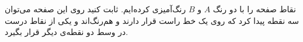     \p 
نقاط صفحه را با دو رنگ
$A$
و
$B$
رنگ‌آمیزی کرده‌ایم. ثابت کنید روی این صفحه می‌توان سه نقطه پیدا کرد که روی یک خط راست قرار دارند و هم‌رنگ‌اند و یکی از نقاط درست در وسط دو نقطه‌ی دیگر قرار بگیرد.